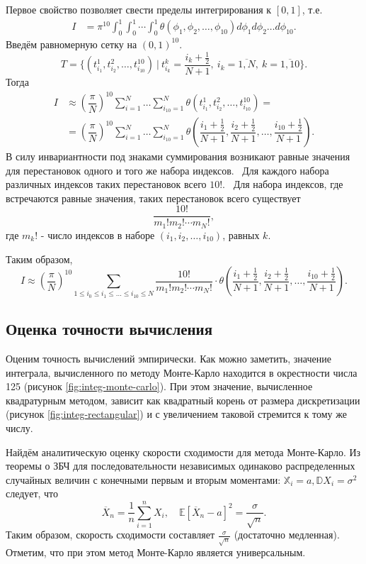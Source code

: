 \documentclass[11pt]{report}
\begin{document}
Первое свойство позволяет свести пределы интегрирования к $[0,1]$, т.е.
$$
\begin{aligned}
I &= \pi^{10} \int_{0}^1\int_{0}^{1}\cdots\int_{0}^1 \theta(\phi_1,\phi_2,\dots,\phi_{10})d\phi_1d\phi_2\dots d\phi_{10}.
\end{aligned}
$$
Введём равномерную сетку на $(0,1)^{10}$.
$$
T = \{ (t^1_{i_1}, t^2_{i_2}, \dots, t^{10}_{i_{10}})~|~t^k_{i_k} = \dfrac{i_k + \frac{1}{2}}{N+1},~ i_k=\overline{1,N},~ k=\overline{1,10} \}.
$$
Тогда
$$
\begin{aligned}
I &\approx \left( \dfrac{\pi}{N} \right)^{10} \sum_{i=1}^{N}\dots\sum_{i_{10}=1}^{N} \theta(t^1_{i_1}, t^2_{i_2}, \dots, t^{10}_{i_{10}}) = \\
&= \left( \dfrac{\pi}{N} \right)^{10} \sum_{i=1}^{N}\dots\sum_{i_{10}=1}^{N}
\theta\left(\dfrac{i_1 + \frac{1}{2}}{N+1}, \dfrac{i_2 + \frac{1}{2}}{N+1}, \dots, \dfrac{i_{10} + \frac{1}{2}}{N+1} \right).
\end{aligned}
$$
В силу инвариантности под знаками суммирования возникают равные значения для перестановок одного и того же набора индексов. \
Для каждого набора различных индексов таких перестановок всего $10!$. \
Для набора индексов, где встречаются равные значения, таких перестановок всего существует
$$
\frac{10!}{m_1!m_2!\cdots m_{N}!},
$$
где $m_k!$ - число индексов в наборе $(i_1,i_2,\dots,i_{10})$, равных $k$.

Таким образом,
$$
I \approx \left( \dfrac{\pi}{N} \right)^{10} \sum_{1\leqslant i_0\leqslant i_1\leqslant\dots \leqslant i_{10}\leqslant N}
\frac{10!}{m_1!m_2!\cdots m_N!}\cdot
\theta\left(\dfrac{i_1 + \frac{1}{2}}{N+1}, \dfrac{i_2 + \frac{1}{2}}{N+1}, \dots, \dfrac{i_{10} + \frac{1}{2}}{N+1} \right).
$$

\subsection{Оценка точности вычисления}

Оценим точность вычислений эмпирически. Как можно заметить, значение интеграла, вычисленного по методу Монте-Карло находится в окрестности числа 125 (рисунок \ref{fig:integ-monte-carlo}). При этом значение, вычисленное квадратурным методом, зависит как квадратный корень от размера дискретизации (рисунок \ref{fig:integ-rectangular}) и с увеличением таковой стремится к тому же числу.

Найдём аналитическую оценку скорости сходимости для метода Монте-Карло. Из теоремы о ЗБЧ для последовательности независимых одинаково распределенных случайных величин с конечными первым и вторым моментами: $\mathbb X_i = a,\mathbb D X_i = \sigma^2$ следует, что
$$
\overline{X}_n = \frac{1}{n}\sum\limits_{i=1}^nX_i, \quad
\mathbb{E}[\overline{X}_n - a ]^2 = \frac{\sigma}{\sqrt{n}}.
$$
Таким образом, скорость сходимости составляет $\frac{\sigma}{\sqrt{n}}$ (достаточно медленная).
Отметим, что при этом метод Монте-Карло является универсальным.
\end{document}
